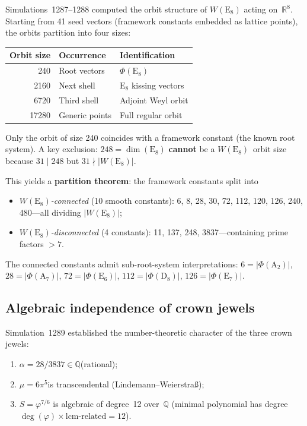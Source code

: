 \documentclass[aps,prd,twocolumn,superscriptaddress,floatfix,nofootinbib]{revtex4-2}
\theoremstyle{definition}
\theoremstyle{remark}
\newcommand{\vp}{\varphi}
\begin{document}
Simulations~1287--1288 computed the orbit structure of
$W(\mathrm{E}_8)$ acting on~$\mathbb{R}^8$.  Starting from 41 seed
vectors (framework constants embedded as lattice points), the orbits
partition into four sizes:

\begin{center}
\begin{tabular}{rll}
\toprule
Orbit size & Occurrence & Identification \\
\midrule
240   & Root vectors   & $\Phi(\mathrm{E}_8)$ \\
2160  & Next shell     & $\mathrm{E}_8$ kissing vectors \\
6720  & Third shell    & Adjoint Weyl orbit \\
17280 & Generic points & Full regular orbit \\
\bottomrule
\end{tabular}
\end{center}

\noindent
Only the orbit of size 240 coincides with a framework constant (the
known root system).  A key exclusion: $248 = \dim(\mathrm{E}_8)$
\textbf{cannot} be a $W(\mathrm{E}_8)$~orbit size because
$31 \mid 248$ but $31 \nmid |W(\mathrm{E}_8)|$.

This yields a \textbf{partition theorem}: the framework constants
split into
\begin{itemize}[nosep]
  \item \emph{$W(\mathrm{E}_8)$-connected} (10 smooth constants):
        6, 8, 28, 30, 72, 112, 120, 126, 240, 480---all dividing
        $|W(\mathrm{E}_8)|$;
  \item \emph{$W(\mathrm{E}_8)$-disconnected} (4 constants):
        11, 137, 248, 3837---containing prime factors $>7$.
\end{itemize}
The connected constants admit sub-root-system interpretations:
$6 = |\Phi(\mathrm{A}_2)|$,\;
$28 = |\Phi(\mathrm{A}_7)|$,\;
$72 = |\Phi(\mathrm{E}_6)|$,\;
$112 = |\Phi(\mathrm{D}_8)|$,\;
$126 = |\Phi(\mathrm{E}_7)|$.

\subsection{Algebraic independence of crown jewels}
\label{sec:algebraic-independence}

Simulation~1289 established the number-theoretic character of the
three crown jewels:

\begin{enumerate}[nosep]
  \item $\alpha = 28/3837 \in \mathbb{Q}$\quad (rational);
  \item $\mu = 6\pi^5$\quad is transcendental (Lindemann--Weierstra\ss);
  \item $S = \vp^{7/6}$ is algebraic of degree~12 over~$\mathbb{Q}$
        (minimal polynomial has degree $\deg(\vp)\times\mathrm{lcm\text{-}related} = 12$).
\end{enumerate}
\end{document}
